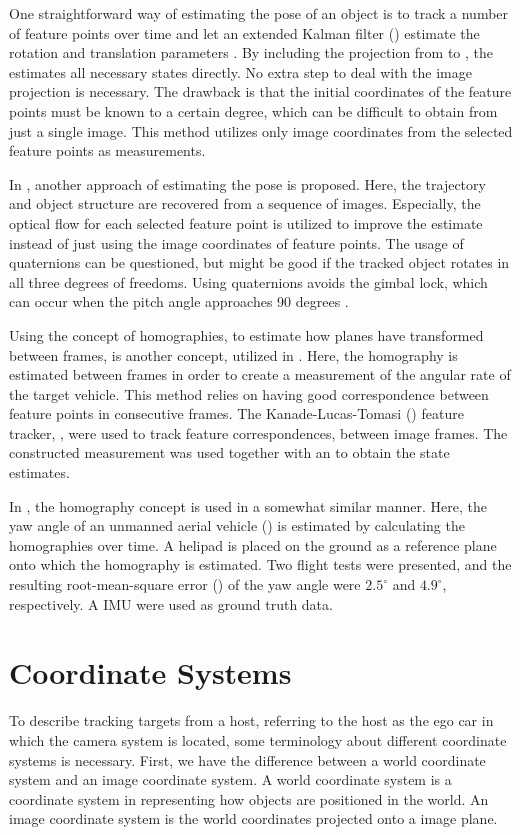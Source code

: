 One straightforward way of estimating the  pose of an object is to track a number of feature points over time and let an extended Kalman filter (\abbrEKF) estimate the rotation and translation parameters \cite{Hajimolahoseini:2014}.
By including the projection from  to , the \abbrEKF estimates all necessary states directly.
No extra step to deal with the image projection is necessary.
The drawback is that the initial  coordinates of the feature points must be known to a certain degree, which can be difficult to obtain from just a single image.
This method utilizes only image coordinates from the selected feature points as measurements.

In \cite{Blostein:2000}, another approach of estimating the  pose is proposed.
Here, the  trajectory and object structure are recovered from a sequence of images.
Especially, the optical flow for each selected feature point is utilized to improve the estimate instead of just using the image coordinates of feature points.
The usage of quaternions can be questioned, but might be good if the tracked object rotates in all three degrees of freedoms.
Using quaternions avoids the gimbal lock, which can occur when the pitch angle approaches 90 degrees \cite{Gustafsson:2012}.

Using the concept of homographies, \ie to estimate how planes have transformed between frames, is another concept, utilized in \cite{Gabb:2013}.
Here, the homography is estimated between frames in order to create a measurement of the angular rate of the target vehicle.
This method relies on having good correspondence between feature points in consecutive frames.
The Kanade-Lucas-Tomasi (\abbrKLT) feature tracker, \eg \cite{Szeliski:2011}, were used to track feature correspondences, between image frames.
The constructed measurement was used together with an \abbrEKF to obtain the state estimates.

In \cite{Mondragon:2010}, the homography concept is used in a somewhat similar manner.
Here, the yaw angle of an unmanned aerial vehicle (\abbrUAV) is estimated by calculating the homographies over time.
A helipad is placed on the ground as a reference plane onto which the homography is estimated.
Two flight tests were presented, and the resulting root-mean-square error (\abbrRMSE) of the yaw angle were $2.5^\circ$ and $4.9^\circ$, respectively.
A IMU were used as ground truth data.

\section{Coordinate Systems}
To describe tracking targets from a host, referring to the host as the ego car in which the camera system is located, some terminology about different coordinate systems is necessary.
First, we have the difference between a world coordinate system  and an image coordinate system.
A world coordinate system is a coordinate system in  representing how objects are positioned in the world.
An image coordinate system is the  world coordinates projected onto a  image plane.

